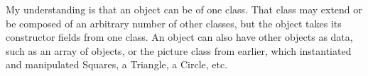 My understanding is that an object can be of one class. That class may
extend or be composed of an arbitrary number of other classes, but the
object takes its constructor fields from one class. An object can also
have other objects as data, such as an array of objects, or the picture
class from earlier, which instantiated and manipulated Squares, a
Triangle, a Circle, etc.
